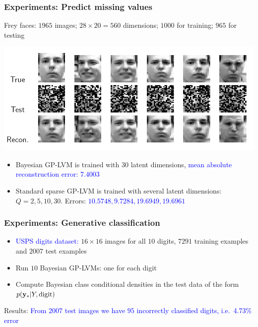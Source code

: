\documentclass{beamer}
\begin{document}
\frame
{
\frametitle{Experiments: Predict missing values}

Frey faces: $1965$ images; $28 \times 20=560$ dimensions;
 $1000$ for training; $965$ for testing 


\begin{center}
\includegraphics[width=1.1\textheight]
{../../../vargplvm/tex/diagrams/Frey2.PNG}
\end{center}

\begin{itemize}

%


\item Bayesian GP-LVM is trained with $30$ latent dimensions, 
     \textcolor{blue}{mean absolute reconstruction error: $7.4003$}


\item Standard sparse GP-LVM is trained with several latent dimensions:
      $Q= 2, 5, 10, 30$. Errors: \textcolor{blue}{$10.5748, 9.7284, 19.6949, 19.6961$}


\end{itemize}   

}

\frame
{
\frametitle{Experiments: Generative classification}

\begin{itemize} 

\item  \textcolor{blue}{USPS digits dataset:} $16 \times 16$ images for all $10$ digits,  $7291$
training examples and $2007$ test examples

\item Run $10$ Bayesian GP-LVMs: one for each digit

\item Compute Bayesian class conditional densities in the test data of
  the form $p(\mathbf{y}_*|Y,\text{digit})$

\end{itemize}

Results: \textcolor{blue}{From $2007$ test images we have $95$ incorrectly
classified digits, i.e.\  4.73\% error}

}
\end{document}
